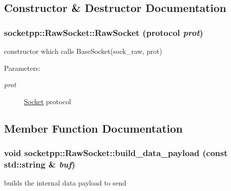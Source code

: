 \subsection{Constructor \& Destructor Documentation}
\hypertarget{classsocketpp_1_1RawSocket_1a77e11388869bc70457efb75cd40b82}{
\subsubsection[{RawSocket}]{\setlength{\rightskip}{0pt plus 5cm}socketpp::RawSocket::RawSocket (protocol {\em prot})}}
\label{classsocketpp_1_1RawSocket_1a77e11388869bc70457efb75cd40b82}


constructor which calls BaseSocket(sock\_\-raw, prot) 

\begin{Desc}
\item[Parameters:]
\begin{description}
\item[{\em prot}]\hyperlink{classsocketpp_1_1Socket}{Socket} protocol \end{description}
\end{Desc}


\subsection{Member Function Documentation}
\hypertarget{classsocketpp_1_1RawSocket_a5e01f4dec94dbbef1c122ce4d7ed4ad}{
\subsubsection[{build\_\-data\_\-payload}]{\setlength{\rightskip}{0pt plus 5cm}void socketpp::RawSocket::build\_\-data\_\-payload (const std::string \& {\em buf})}}
\label{classsocketpp_1_1RawSocket_a5e01f4dec94dbbef1c122ce4d7ed4ad}


builds the internal data payload to send 

